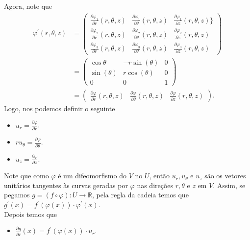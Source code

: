 \begin{homeworkProblem}[Seção 2-7]
\begin{solution}
    Agora, note que
    \begin{align*}
      \varphi^{\prime}(r,\theta,z)&=\begin{pmatrix}
        \frac{\partial \varphi_1}{\partial r}(r,\theta,z) & \frac{\partial \varphi_1}{\partial \theta}(r,\theta,z) & \frac{\partial \varphi_1}{\partial z}(r,\theta,z)\}\\
        \frac{\partial \varphi_2}{\partial r}(r,\theta,z) & \frac{\partial \varphi_2}{\partial \theta}(r,\theta,z) & \frac{\partial \varphi_2}{\partial z}(r,\theta,z)\\
        \frac{\partial \varphi_3}{\partial r}(r,\theta,z) & \frac{\partial \varphi_3}{\partial \theta}(r,\theta,z) & \frac{\partial \varphi_3}{\partial z}(r,\theta,z)
      \end{pmatrix}\\
      &=\begin{pmatrix}
        \cos\theta & -r\sin(\theta) & 0\\
        \sin(\theta) & r\cos(\theta) & 0\\
        0 & 0 & 1
      \end{pmatrix}\\
      &=\begin{pmatrix}
        \frac{\partial \varphi}{\partial r}(r,\theta,z) & \frac{\partial \varphi}{\partial \theta}(r,\theta,z) & \frac{\partial \varphi}{\partial z}(r,\theta,z)
      \end{pmatrix}.
    \end{align*}
    Logo, nos podemos definir o seguinte
    \begin{itemize}
      \item $u_r=\frac{\partial \varphi}{\partial r}$.
      \item $r u_\theta=\frac{\partial \varphi}{\partial \theta}$.
      \item $u_{z}=\frac{\partial \varphi}{\partial z}$.
    \end{itemize}
    Note que como $\varphi$ é um difeomorfismo do $V$ no $U$, então $u_r,u_\theta$ e $u_z$ são os vetores unitários tangentes às curvas geradas por $\varphi$ nas direções $r,\theta$ e $z$ em $V$. 
    Assim, se pegamos $g=(f\circ \varphi):U\to\mathbb{R}$, pela regla da cadeia temos que $g^{\prime}(x)=f^{\prime}(\varphi(x))\cdot\varphi^{\prime}(x)$.\\
    Depois temos que
    \begin{itemize}
      \item $\frac{\partial g}{\partial r}(x)=f^{\prime}(\varphi(x))\cdot u_r$.

\end{itemize}
\end{solution}
\end{homeworkProblem}
